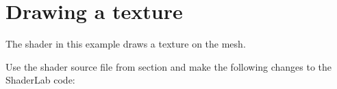 \chapter{Drawing a texture}
\hypertarget{md__hey_tea_9_2_library_2_package_cache_2com_8unity_8render-pipelines_8universal_0d14_80_88_2_do92cbff61267a4ef6cd2a05431c845525}{}\label{md__hey_tea_9_2_library_2_package_cache_2com_8unity_8render-pipelines_8universal_0d14_80_88_2_do92cbff61267a4ef6cd2a05431c845525}
\label{md__hey_tea_9_2_library_2_package_cache_2com_8unity_8render-pipelines_8universal_0d14_80_88_2_do92cbff61267a4ef6cd2a05431c845525_autotoc_md2711}%
%
 The  shader in this example draws a texture on the mesh.

Use the  shader source file from section  and make the following changes to the Shader\+Lab code\+:


